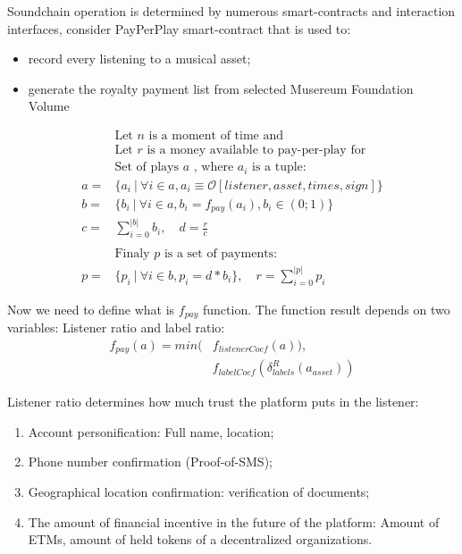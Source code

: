 \documentclass[12pt]{report}
\begin{document}
Soundchain operation is determined by numerous smart-contracts and interaction interfaces, 
consider PayPerPlay smart-contract that is used to:
\begin{itemize}
	\item record every listening to a musical asset;
	\item generate the royalty payment list from selected Musereum Foundation Volume
\end{itemize}
\begin{align}
& \text {Let } n \text{ is a moment of time and} \nonumber\\
& \text{Let } r \text{ is a money available to pay-per-play for} \nonumber\\
& \text{Set of plays } a \text{ , where } a_i \text{ is a tuple:}  \nonumber\\
a = &\{a_i \ | \ \forall i \in a, a_i \equiv \mathcal{O}[listener, asset, times, sign] \} \\
b = &\{b_i \ | \ \forall i \in a, b_i = f_{pay}(a_i), b_i \in (0; 1) \} \\ 
c = &\sum\limits^{|b|}_{i=0} b_i, \quad d = \frac{r}{c} \\
& \nonumber\\
& \text{Finaly } p \text{ is a set of payments: } \nonumber\\
p = &\{ p_i \ | \ \forall i \in b, p_i = d * b_i \}, \quad r = \sum\limits^{|p|}_{i=0} p_i
\end{align}

Now we need to define what is $f_{pay}$ function. The function result depends on two variables: Listener ratio and label ratio:
\begin{align}
f_{pay}(a) = min(&f_{listenerCoef}(a)),\\
						 &f_{labelCoef}(\delta^{R}_{labels}(a_{asset}))
\end{align}

Listener ratio determines how much trust the platform puts in the listener: 
\begin{enumerate}
	\item Account personification: Full name, location;
	\item Phone number confirmation (Proof-of-SMS);
	\item Geographical location confirmation: verification of documents;
	\item The amount of financial incentive in the future of the platform: Amount of ETMs, amount of held tokens of a decentralized organizations.
\end{enumerate}
\end{document}
